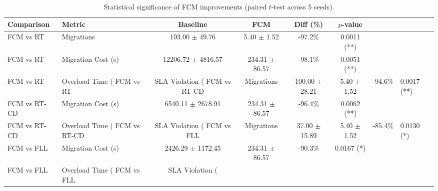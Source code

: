 \begin{table}[t]
\caption{Statistical significance of FCM improvements (paired $t$-test across 5 seeds).}
\label{tab:significance}
\centering
\scriptsize
\begin{tabular}{llcccc}
\toprule
Comparison & Metric & Baseline & FCM & Diff (\%) & $p$-value \\
\midrule
FCM vs RT & Migrations & 193.00 $\pm$ 49.76 & 5.40 $\pm$ 1.52 & -97.2\% & 0.0011 (**) \\
FCM vs RT & Migration Cost (s) & 12206.72 $\pm$ 4816.57 & 234.31 $\pm$ 86.57 & -98.1\% & 0.0051 (**) \\
FCM vs RT & Overload Time (%
FCM vs RT & SLA Violation (%
FCM vs RT-CD & Migrations & 100.00 $\pm$ 28.21 & 5.40 $\pm$ 1.52 & -94.6\% & 0.0017 (**) \\
FCM vs RT-CD & Migration Cost (s) & 6540.11 $\pm$ 2678.91 & 234.31 $\pm$ 86.57 & -96.4\% & 0.0062 (**) \\
FCM vs RT-CD & Overload Time (%
FCM vs RT-CD & SLA Violation (%
FCM vs FLL & Migrations & 37.00 $\pm$ 15.89 & 5.40 $\pm$ 1.52 & -85.4\% & 0.0130 (*) \\
FCM vs FLL & Migration Cost (s) & 2426.29 $\pm$ 1172.45 & 234.31 $\pm$ 86.57 & -90.3\% & 0.0167 (*) \\
FCM vs FLL & Overload Time (%
FCM vs FLL & SLA Violation (%
\bottomrule
{}
\end{tabular}
\end{table}